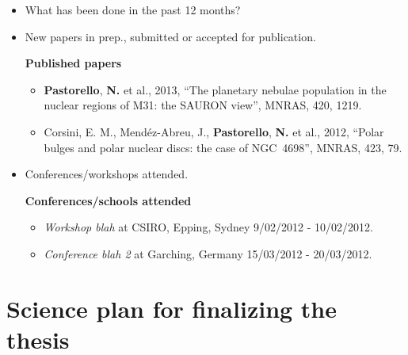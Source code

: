 \documentclass[useAMS,usenatbib,onecolumn]{mnras}
\begin{document}
\begin{itemize}
  \item{What has been done in the past 12 months?}
  \item{New papers in prep., submitted or accepted for publication.\\}

  \textbf{Published papers}
  \begin{itemize}
      \item{\textbf{Pastorello}, \textbf{N.} et al., 2013}, ``The planetary nebulae population in the nuclear regions of M31: the SAURON view'', MNRAS, 420, 1219.
      \item{Corsini, E. M., Mend\'ez-Abreu, J., \textbf{Pastorello}, \textbf{N.} et al., 2012}, ``Polar bulges and polar nuclear discs: the case of NGC~4698'', MNRAS, 423, 79.
  \end{itemize}

  \item{Conferences/workshops attended.\\}

  \textbf{Conferences/schools attended}
  \begin{itemize}
      \item{\textit{Workshop blah}} at CSIRO, Epping, Sydney 9/02/2012 - 10/02/2012.
      \item{\textit{Conference blah 2}} at Garching, Germany 15/03/2012 - 20/03/2012.
  \end{itemize}

\end{itemize}


\section{Science plan for finalizing the thesis}
\label{sec:sciencePlan}
\end{document}
